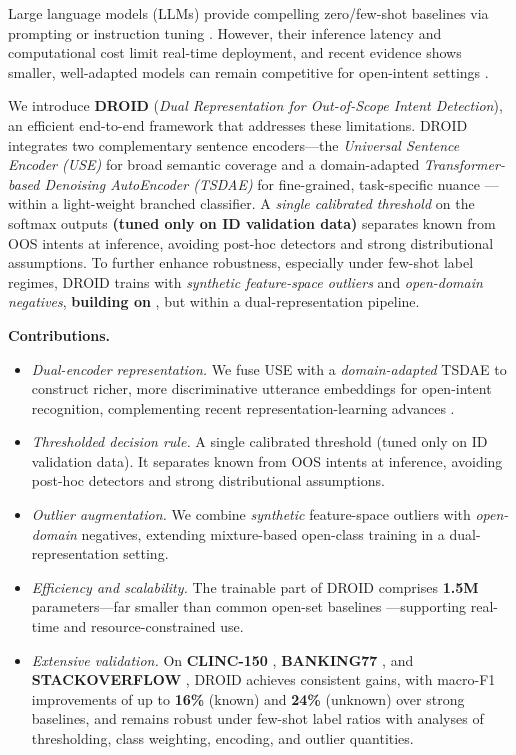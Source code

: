 \documentclass[journal,letterpaper]{IEEEtran}
\begin{document}
Large language models (LLMs) provide compelling zero/few-shot baselines via prompting or instruction tuning \cite{marzagao-etal-2024-beyond,zhang-etal-2024-discrimination,arora-varma-2024-intent}. However, their inference latency and computational cost limit real-time deployment, and recent evidence shows smaller, well-adapted models can remain competitive for open-intent settings \cite{arora-varma-2024-intent,marzagao-etal-2024-beyond}.

We introduce \textbf{DROID} (\emph{Dual Representation for Out-of-Scope Intent Detection}), an efficient end-to-end framework that addresses these limitations. DROID integrates two complementary sentence encoders—the \emph{Universal Sentence Encoder (USE)} for broad semantic coverage \cite{Daniel_2018} and a domain-adapted \emph{Transformer-based Denoising AutoEncoder (TSDAE)} for fine-grained, task-specific nuance \cite{Wang_2021}—within a light-weight branched classifier. A \emph{single calibrated threshold} on the softmax outputs \textbf{(tuned only on ID validation data)} separates known from OOS intents at inference, avoiding post-hoc detectors and strong distributional assumptions. To further enhance robustness, especially under few-shot label regimes, DROID trains with \emph{synthetic feature-space outliers} and \emph{open-domain negatives}, \textbf{building on} \cite{Zhan_2021}, but within a dual-representation pipeline.

\textbf{Contributions.}
\begin{itemize}
    \item \emph{Dual-encoder representation.} We fuse USE \cite{Daniel_2018} with a \emph{domain-adapted} TSDAE \cite{Wang_2021} to construct richer, more discriminative utterance embeddings for open-intent recognition, complementing recent representation-learning advances \cite{chen2024tcab,zhang2024finetuning}.
    \item \emph{Thresholded decision rule.} A single calibrated threshold (tuned only on ID validation data). It separates known from OOS intents at inference, avoiding post-hoc detectors and strong distributional assumptions.
    \item \emph{Outlier augmentation.} We combine \emph{synthetic} feature-space outliers with \emph{open-domain} negatives, extending mixture-based open-class training \cite{Zhan_2021} in a dual-representation setting.
    \item \emph{Efficiency and scalability.} The trainable part of DROID comprises \textbf{1.5M} parameters—far smaller than common open-set baselines \cite{Zhan_2021}—supporting real-time and resource-constrained use.
    \item \emph{Extensive validation.} On \textbf{CLINC-150} \cite{Larson_2019}, \textbf{BANKING77} \cite{Casanueva_2020}, and \textbf{STACKOVERFLOW} \cite{Xu_2015}, DROID achieves consistent gains, with macro-F1 improvements of up to \textbf{16\%} (known) and \textbf{24\%} (unknown) over strong baselines, and remains robust under few-shot label ratios with analyses of thresholding, class weighting, encoding, and outlier quantities.
\end{itemize}
\end{document}
